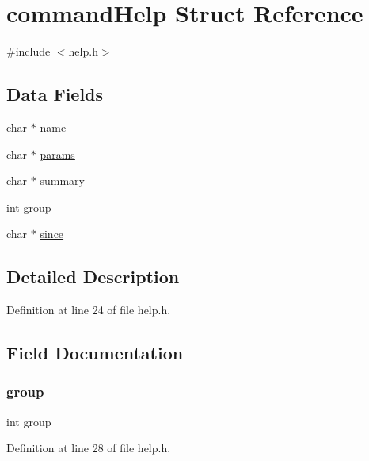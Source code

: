 \hypertarget{structcommand_help}{}\section{command\+Help Struct Reference}
\label{structcommand_help}


{\ttfamily \#include $<$help.\+h$>$}

\subsection*{Data Fields}
\begin{DoxyCompactItemize}
\item 
char $\ast$ \hyperlink{structcommand_help_a5ac083a645d964373f022d03df4849c8}{name}
\item 
char $\ast$ \hyperlink{structcommand_help_a0d119d211b6770402e90c832e7d03767}{params}
\item 
char $\ast$ \hyperlink{structcommand_help_a322a4c1fa51c3fb9a98f2d329a90ecfa}{summary}
\item 
int \hyperlink{structcommand_help_a0242027ec3331f3d5793c42d21b6f4e1}{group}
\item 
char $\ast$ \hyperlink{structcommand_help_ae870034983eefc8a613f065adb0db99d}{since}
\end{DoxyCompactItemize}


\subsection{Detailed Description}


Definition at line 24 of file help.\+h.



\subsection{Field Documentation}
\mbox{\label{structcommand_help_a0242027ec3331f3d5793c42d21b6f4e1}} 
\subsubsection{\texorpdfstring{group}{group}}
{\footnotesize\ttfamily int group}



Definition at line 28 of file help.\+h.

